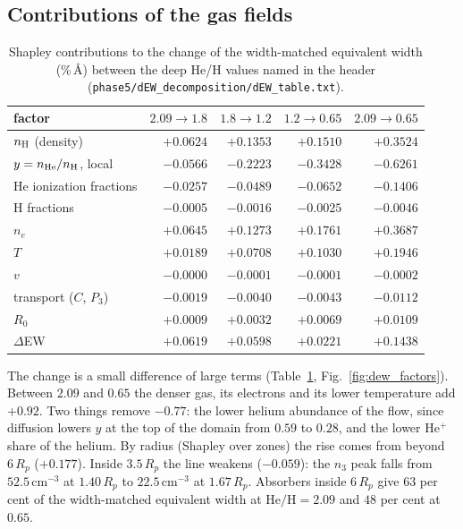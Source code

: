 \documentclass[english,a4paper]{my_memo}
\begin{document}
\subsection{Contributions of the gas fields}

\begin{table}[htbp]\centering\small
\caption{Shapley contributions to the change of the width-matched
equivalent width (\%\,\AA) between the deep He/H values named in the
header (\texttt{phase5/dEW\_decomposition/dEW\_table.txt}).}
\label{tab:dew_factors}
\begin{tabular}{lrrrr}
\toprule
factor & $2.09 \to 1.8$ & $1.8 \to 1.2$ & $1.2 \to 0.65$ & $2.09 \to 0.65$ \\
\midrule
$n_{\rm H}$ (density)        & $+0.0624$ & $+0.1353$ & $+0.1510$ & $+0.3524$ \\
$y = n_{\rm He}/n_{\rm H}$, local & $-0.0566$ & $-0.2223$ & $-0.3428$ & $-0.6261$ \\
He ionization fractions      & $-0.0257$ & $-0.0489$ & $-0.0652$ & $-0.1406$ \\
H fractions                  & $-0.0005$ & $-0.0016$ & $-0.0025$ & $-0.0046$ \\
$n_e$                        & $+0.0645$ & $+0.1273$ & $+0.1761$ & $+0.3687$ \\
$T$                          & $+0.0189$ & $+0.0708$ & $+0.1030$ & $+0.1946$ \\
$v$                          & $-0.0000$ & $-0.0001$ & $-0.0001$ & $-0.0002$ \\
transport ($C$, $P_3$)       & $-0.0019$ & $-0.0040$ & $-0.0043$ & $-0.0112$ \\
$R_0$                        & $+0.0009$ & $+0.0032$ & $+0.0069$ & $+0.0109$ \\
\midrule
$\Delta$EW                   & $+0.0619$ & $+0.0598$ & $+0.0221$ & $+0.1438$ \\
\bottomrule
\end{tabular}
\end{table}

The change is a small difference of large terms (Table~\ref{tab:dew_factors},
Fig.~\ref{fig:dew_factors}). Between $2.09$ and $0.65$ the denser gas, its
electrons and its lower temperature add $+0.92$. Two things remove $-0.77$:
the lower helium abundance of the flow, since diffusion lowers $y$ at the
top of the domain from $0.59$ to $0.28$, and the lower He$^+$ share of the
helium. By radius (Shapley over zones) the rise comes from beyond
$6\,R_p$ ($+0.177$). Inside $3.5\,R_p$ the line weakens ($-0.059$): the
$n_3$ peak falls from $52.5$\,cm$^{-3}$ at $1.40\,R_p$ to $22.5$\,cm$^{-3}$
at $1.67\,R_p$. Absorbers inside $6\,R_p$ give $63$ per cent of the
width-matched equivalent width at $\mathrm{He/H} = 2.09$ and $48$ per cent
at $0.65$.
\end{document}

